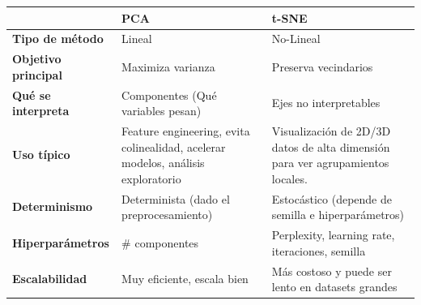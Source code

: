 \documentclass[12pt]{article}
\begin{document}
\vspace{1.5em}

\begin{tabularx}{\textwidth}{p{3cm} X X}
    \toprule
    & \textbf{PCA} & \textbf{t-SNE} \\
    \midrule
    \textbf{Tipo de método} & Lineal & No-Lineal \\
    \addlinespace
    \textbf{Objetivo principal} & Maximiza varianza & Preserva vecindarios \\
    \addlinespace
    \textbf{Qué se interpreta} & Componentes (Qué variables pesan) & Ejes no interpretables \\
    \addlinespace
    \textbf{Uso típico} & Feature engineering, evita colinealidad, acelerar modelos, análisis exploratorio & Visualización de 2D/3D datos de alta dimensión para ver agrupamientos locales. \\
    \addlinespace
    \textbf{Determinismo} & Determinista (dado el preprocesamiento) & Estocástico (depende de semilla e hiperparámetros) \\
    \addlinespace
    \textbf{Hiperparámetros} & \# componentes & Perplexity, learning rate, iteraciones, semilla \\
    \addlinespace
    \textbf{Escalabilidad} & Muy eficiente, escala bien & Más costoso y puede ser lento en datasets grandes \\
    \bottomrule
\end{tabularx}
\end{document}
